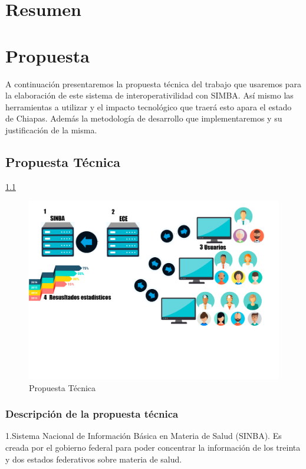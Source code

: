 \chapter*{Resumen}


\chapter{Propuesta} \label{sec:propuesta}

A continuación presentaremos la propuesta técnica del trabajo que usaremos para la elaboración de este sistema de interoperativilidad con SIMBA. Así mismo las herramientas a utilizar y el impacto tecnológico que traerá esto apara el estado de Chiapas. Además la metodología de desarrollo que implementaremos y su justificación de la misma.

\section{Propuesta Técnica}\ref{propuesta}

\begin{figure}[H]
  \label{propuesta}
  \centering
  \includegraphics[scale=.2]{lib/assets/propuesta-tecnica}
  \caption{Propuesta Técnica}
\end{figure}
\subsection{Descripción de la propuesta técnica}
1.Sistema Nacional de Información Básica en Materia de Salud (SINBA). Es creada por el gobierno federal para poder concentrar la información de los treinta y dos estados federativos sobre materia de salud.

